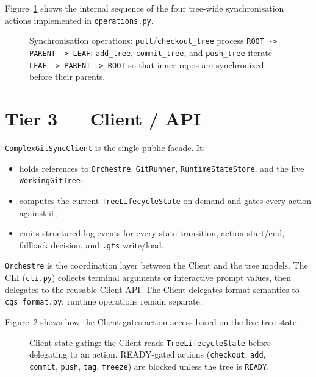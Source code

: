 Figure~\ref{fig:ops-sequence} shows the internal sequence of the four
tree-wide synchronisation actions implemented in \texttt{operations.py}.

\begin{figure}[ht]
\centering
\caption{Synchronisation operations: \texttt{pull}/\texttt{checkout\_tree}
  process \texttt{ROOT -> PARENT -> LEAF}; \texttt{add\_tree},
  \texttt{commit\_tree}, and \texttt{push\_tree} iterate
  \texttt{LEAF -> PARENT -> ROOT} so that inner repos are synchronized before
  their parents.}
\label{fig:ops-sequence}

\end{figure}

\section{Tier 3 — Client / API}
\label{sec:tier-client}

\texttt{ComplexGitSyncClient} is the single public facade.  It:

\begin{itemize}
  \item holds references to \texttt{Orchestre}, \texttt{GitRunner},
    \texttt{RuntimeStateStore}, and the live \texttt{WorkingGitTree};
  \item computes the current \texttt{TreeLifecycleState} on demand and gates
    every action against it;
  \item emits structured log events for every state transition, action start/end,
    fallback decision, and \texttt{.gts} write/load.
\end{itemize}

\texttt{Orchestre} is the coordination layer between the Client and the tree
models. The CLI (\texttt{cli.py}) collects terminal arguments or interactive
prompt values, then delegates to the reusable Client API. The Client delegates
format semantics to \texttt{cgs\_format.py}; runtime operations remain
separate.

Figure~\ref{fig:client-gating} shows how the Client gates action access based
on the live tree state.

\begin{figure}[ht]
\centering
\caption{Client state-gating: the Client reads \texttt{TreeLifecycleState}
  before delegating to an action.  READY-gated actions (\texttt{checkout},
  \texttt{add}, \texttt{commit}, \texttt{push}, \texttt{tag},
  \texttt{freeze}) are blocked unless the tree is \texttt{READY}.}
\label{fig:client-gating}

\end{figure}

